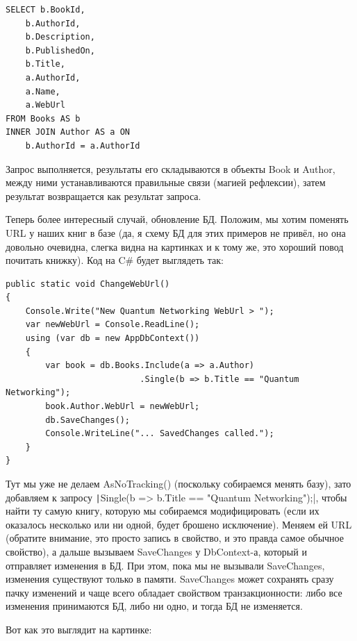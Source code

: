 \documentclass{../../text-style}
\begin{document}
\begin{verbatim}
SELECT b.BookId,
    b.AuthorId,
    b.Description,
    b.PublishedOn,
    b.Title,
    a.AuthorId,
    a.Name,
    a.WebUrl
FROM Books AS b
INNER JOIN Author AS a ON
    b.AuthorId = a.AuthorId
\end{verbatim}

Запрос выполняется, результаты его складываются в объекты Book и Author, между ними устанавливаются правильные связи (магией рефлексии), затем результат возвращается как результат запроса.

Теперь более интересный случай, обновление БД. Положим, мы хотим поменять URL у наших книг в базе (да, я схему БД для этих примеров не привёл, но она довольно очевидна, слегка видна на картинках и к тому же, это хороший повод почитать книжку). Код на C\# будет выглядеть так:

\begin{verbatim}
public static void ChangeWebUrl()
{
    Console.Write("New Quantum Networking WebUrl > ");
    var newWebUrl = Console.ReadLine();
    using (var db = new AppDbContext())
    {
        var book = db.Books.Include(a => a.Author)
                           .Single(b => b.Title == "Quantum Networking");
        book.Author.WebUrl = newWebUrl;
        db.SaveChanges();
        Console.WriteLine("... SavedChanges called.");
    }
}
\end{verbatim}

Тут мы уже не делаем AsNoTracking() (поскольку собираемся менять базу), зато добавляем к запросу \texttt|Single(b => b.Title == "Quantum Networking");|, чтобы найти ту самую книгу, которую мы собираемся модифицировать (если их оказалось несколько или ни одной, будет брошено исключение). Меняем ей URL (обратите внимание, это просто запись в свойство, и это правда самое обычное свойство), а дальше вызываем SaveChanges у DbContext-а, который и отправляет изменения в БД. При этом, пока мы не вызывали SaveChanges, изменения существуют только в памяти. SaveChanges может сохранять сразу пачку изменений и чаще всего обладает свойством транзакционности: либо все изменения принимаются БД, либо ни одно, и тогда БД не изменяется.

Вот как это выглядит на картинке:
\end{document}
